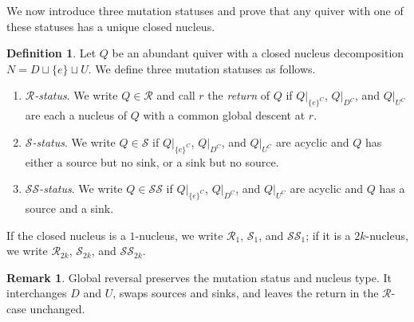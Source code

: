 \documentclass[10pt,a4paper]{amsart}
\theoremstyle{definition}
\newtheorem{definition}[definition]{Definition}
\theoremstyle{definition}
\newtheorem{remark}[remark]{Remark}
\numberwithin{equation}{section}
\numberwithin{table}{section}
\newcommand{\Rclass}{\mathcal{R}}
\newcommand{\SSclass}{\mathcal{SS}}
\newcommand{\Sclass}{\mathcal{S}}
\begin{document}
We now introduce three mutation statuses and prove that any quiver with one
of these statuses has a unique closed nucleus.

\begin{definition}\label{def:classes}
Let $Q$ be an abundant quiver with a closed nucleus decomposition
$N=D\sqcup\{e\}\sqcup U$. We define three mutation statuses as follows.
\begin{enumerate}[label=(\roman*),leftmargin=2.2em,itemsep=2pt]
\item \emph{$\Rclass$-status}.
We write $Q\in\Rclass$ and call $r$ the \emph{return} of $Q$ if
$Q|_{\{e\}^C}$, $Q|_{D^C}$, and $Q|_{U^C}$ are each a nucleus of $Q$ with a
common global descent at $r$.
\item \emph{$\Sclass$-status}.
We write $Q\in\Sclass$ if $Q|_{\{e\}^C}$, $Q|_{D^C}$, and $Q|_{U^C}$
are acyclic and $Q$ has either a source but no sink, or a sink but no source.
\item \emph{$\SSclass$-status}.
We write $Q\in\SSclass$ if $Q|_{\{e\}^C}$, $Q|_{D^C}$, and $Q|_{U^C}$
are acyclic and $Q$ has a source and a sink.
\end{enumerate}
\end{definition}

If the closed nucleus is a $1$-nucleus, we write $\Rclass_1$, $\Sclass_1$,
and $\SSclass_1$; if it is a $2k$-nucleus, we write $\Rclass_{2k}$,
$\Sclass_{2k}$, and $\SSclass_{2k}$.

\begin{remark}\label{rem:global-reversal}
Global reversal preserves the mutation status and nucleus type. It
interchanges $D$ and $U$, swaps sources and sinks, and leaves the return in
the $\Rclass$-case unchanged.
\end{remark}
\end{document}
